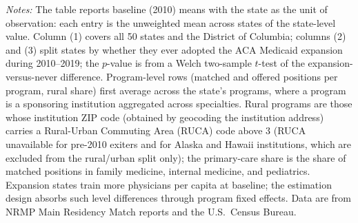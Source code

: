 


\clearpage

\begin{table}[H]
\centering
\singlespacing
\small
\begin{threeparttable}
\caption{Summary Statistics at Baseline (2010)}
\label{tab:sumstats}

\begin{tablenotes}\footnotesize
\item \textit{Notes:} The table reports baseline (2010) means with the state as the unit of observation: each entry is the unweighted mean across states of the state-level value. Column (1) covers all 50 states and the District of Columbia; columns (2) and (3) split states by whether they ever adopted the ACA Medicaid expansion during 2010--2019; the $p$-value is from a Welch two-sample $t$-test of the expansion-versus-never difference. Program-level rows (matched and offered positions per program, rural share) first average across the state's programs, where a program is a sponsoring institution aggregated across specialties. Rural programs are those whose institution ZIP code (obtained by geocoding the institution address) carries a Rural-Urban Commuting Area (RUCA) code above 3 (RUCA unavailable for pre-2010 exiters and for Alaska and Hawaii institutions, which are excluded from the rural/urban split only); the primary-care share is the share of matched positions in family medicine, internal medicine, and pediatrics. Expansion states train more physicians per capita at baseline; the estimation design absorbs such level differences through program fixed effects. Data are from NRMP Main Residency Match reports and the U.S.\ Census Bureau.
\end{tablenotes}
\end{threeparttable}
\end{table}

\clearpage

